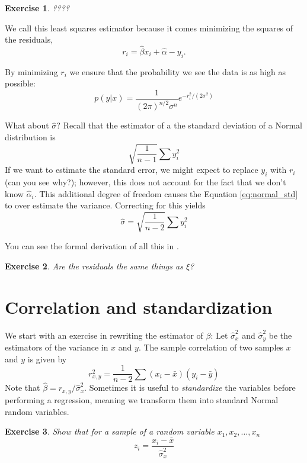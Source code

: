 \documentclass{amsart}
\newtheorem{exercise}{Exercise}
\begin{document}
\begin{exercise} ????
\end{exercise}


We call this least squares estimator because it comes minimizing the squares of the residuals, 
\begin{equation}
r_i =\hat{\beta} x_i + \hat{\alpha}- y_i. 
\end{equation}

By minimizing $r_i$ we ensure that the probability we see the data is as high as possible: 
\begin{equation}
p(y|x) = \frac{1}{(2\pi)^{n/2} \sigma^n}e^{-r_i^2/(2\sigma^2)}
\end{equation}

What about $\hat{\sigma}$? Recall that the estimator of a the standard deviation of a Normal distribution is 
\begin{equation}\label{eq:normal_std}
\sqrt{\frac{1}{n-1}}\sum y_i^2
\end{equation}
If we want to estimate the standard error, we might expect to replace $y_i$ with $r_i$ (can you see why?); however, this does not account for the fact that we don't know $\hat{\alpha}_i$. This additional degree of freedom causes the Equation \eqref{eq:normal_std} to over estimate the variance. Correcting for this yields  
\begin{equation}
\hat{\sigma} = \sqrt{\frac{1}{n-2}}\sum y_i^2
\end{equation}

You can see the formal derivation of all this in \cite{}. 


\begin{exercise}  Are the residuals the same things as $\xi$? 
\end{exercise}



\section{Correlation and standardization}

We start with an exercise in rewriting the estimator of $\beta$: 
Let $\hat{\sigma}_x^2$ and $\hat{\sigma}_y^2$ be the estimators of the variance in $x$ and $y$. The sample correlation of two samples $x$ and $y$ is given by 
\begin{equation}
r_{x,y}^2 = \frac{1}{n-2}\sum (x_i - \bar{x})(y_i - \bar{y})
\end{equation}
Note that $\hat{\beta} = r_{x,y}/\hat{\sigma}_x^2$. Sometimes it is useful to \emph{standardize} the variables before performing a regression, meaning we transform them into standard Normal random variables. 
 \begin{exercise}  Show that for a sample of a random variable $x_1,x_2,\dots,x_n$
 \begin{equation}
 z_i = \frac{x_i - \bar{x}}{\hat{\sigma}_x^2}
 \end{equation}
\end{exercise}
\end{document}
